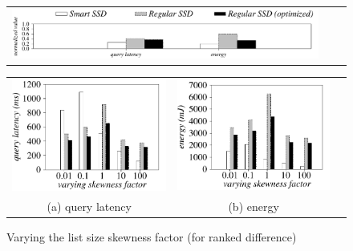 \begin{figure}[tbp]
  \centering
    \begin{tabular}{ccc}
 \includegraphics[width=0.95\columnwidth]{figures/banner.pdf}%
\end{tabular}
\renewcommand{\tabcolsep}{0.1mm}


  \begin{tabular}{ccc}
 \includegraphics[width=0.5\columnwidth]{figures/RankDifference-time-VaryListSkew-eps-converted-to.pdf}&
  \includegraphics[width=0.5\columnwidth]{figures/RankDifference-energy-VaryListSkew-eps-converted-to.pdf}\\
  (a) query latency & (b) energy
\end{tabular}

  \caption{Varying the list size skewness factor (for ranked difference)}
  \label{fig:varyListSkewRankDifference}
 \end{figure}




